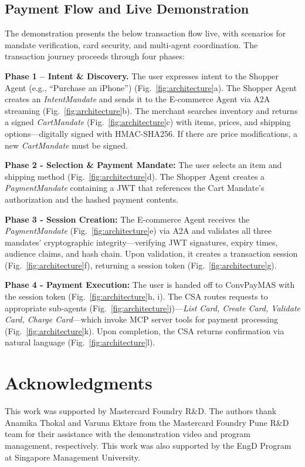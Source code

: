 \documentclass[sigconf]{aamas}
\begin{document}
\subsection{Payment Flow and Live Demonstration}
The demonstration presents the below transaction flow live, with scenarios for mandate verification, card security, and multi-agent coordination. The transaction journey proceeds through four phases:


\textbf{Phase 1 -- Intent \& Discovery.}
The user expresses intent to the Shopper Agent (e.g., ``Purchase an iPhone'') (Fig.~\ref{fig:architecture}a). The Shopper Agent creates an \textit{IntentMandate} and sends it to the E-commerce Agent via A2A streaming (Fig.~\ref{fig:architecture}b). The merchant searches inventory and returns a signed \textit{CartMandate} (Fig.~\ref{fig:architecture}c) with items, prices, and shipping options—digitally signed with HMAC-SHA256. If there are price modifications, a new \textit{CartMandate} must be signed.

\textbf{Phase 2 - Selection \& Payment Mandate:} The user selects an item and shipping method (Fig.~\ref{fig:architecture}d). The Shopper Agent creates a \textit{PaymentMandate} containing a JWT that references the Cart Mandate's authorization and the hashed payment contents.

\textbf{Phase 3 - Session Creation:} The E-commerce Agent receives the \textit{PaymentMandate} (Fig.~\ref{fig:architecture}e) via A2A and validates all three mandates' cryptographic integrity—verifying JWT signatures, expiry times, audience claims, and hash chain. Upon validation, it creates a transaction session (Fig.~\ref{fig:architecture}f), returning a session token (Fig.~\ref{fig:architecture}g).

\textbf{Phase 4 - Payment Execution:} The user is handed off to ConvPayMAS with the session token (Fig.~\ref{fig:architecture}h, i). The CSA routes requests to appropriate sub-agents (Fig.~\ref{fig:architecture}j)—\textit{List Card, Create Card, Validate Card, Charge Card}—which invoke MCP server tools for payment processing (Fig.~\ref{fig:architecture}k). Upon completion, the CSA returns confirmation via natural language (Fig.~\ref{fig:architecture}l).



\clearpage
\section{Acknowledgments}
This work was supported by Mastercard Foundry R\&D. The authors thank Anamika Thokal and Varuna Ektare from the Mastercard Foundry Pune R\&D team for their assistance with the demonstration video and program management, respectively.
This work was also supported by the EngD Program at Singapore Management University.


\end{document}
